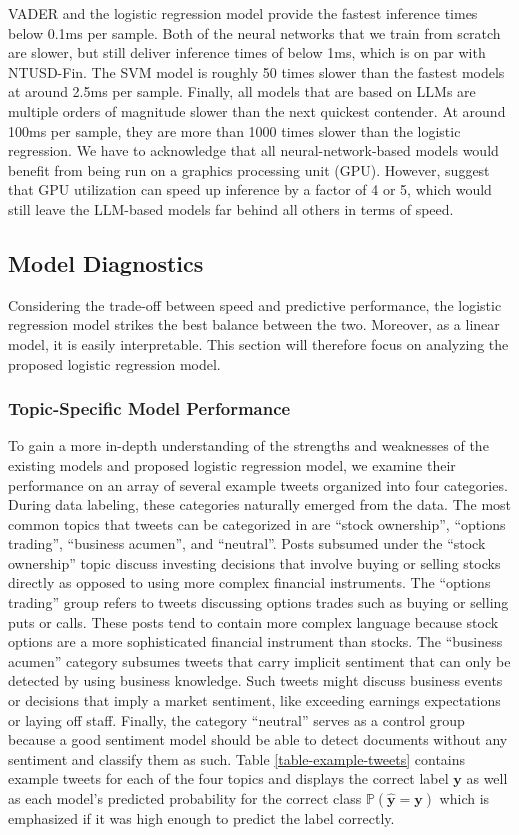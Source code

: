 VADER and the logistic regression model provide the fastest inference times below 0.1ms per sample. Both of the neural networks that we train from scratch are slower, but still deliver inference times of below 1ms, which is on par with NTUSD-Fin. The SVM model is roughly 50 times slower than the fastest models at around 2.5ms per sample. Finally, all models that are based on LLMs are multiple orders of magnitude slower than the next quickest contender. At around 100ms per sample, they are more than 1000 times slower than the logistic regression. We have to acknowledge that all neural-network-based models would benefit from being run on a graphics processing unit (GPU). However,  suggest that GPU utilization can speed up inference by a factor of 4 or 5, which would still leave the LLM-based models far behind all others in terms of speed.

\subsection{Model Diagnostics}
Considering the trade-off between speed and predictive performance, the logistic regression model strikes the best balance between the two. Moreover, as a linear model, it is easily interpretable. This section will therefore focus on analyzing the proposed logistic regression model.

\subsubsection{Topic-Specific Model Performance}
To gain a more in-depth understanding of the strengths and weaknesses of the existing models and proposed logistic regression model, we examine their performance on an array of several example tweets organized into four categories. During data labeling, these categories naturally emerged from the data. The most common topics that tweets can be categorized in are ``stock ownership'', ``options trading'', ``business acumen'', and ``neutral''. Posts subsumed under the ``stock ownership'' topic discuss investing decisions that involve buying or selling stocks directly as opposed to using more complex financial instruments. The ``options trading'' group refers to tweets discussing options trades such as buying or selling puts or calls. These posts tend to contain more complex language because stock options are a more sophisticated financial instrument than stocks. The ``business acumen'' category subsumes tweets that carry implicit sentiment that can only be detected by using business knowledge. Such tweets might discuss business events or decisions that imply a market sentiment, like exceeding earnings expectations or laying off staff. Finally, the category ``neutral'' serves as a control group because a good sentiment model should be able to detect documents without any sentiment and classify them as such. Table \ref{table-example-tweets} contains example tweets for each of the four topics and displays the correct label $\bm{y}$ as well as each model's predicted probability for the correct class $\bm{\mathbb{P}(\hat y = y)}$ which is emphasized if it was high enough to predict the label correctly.


